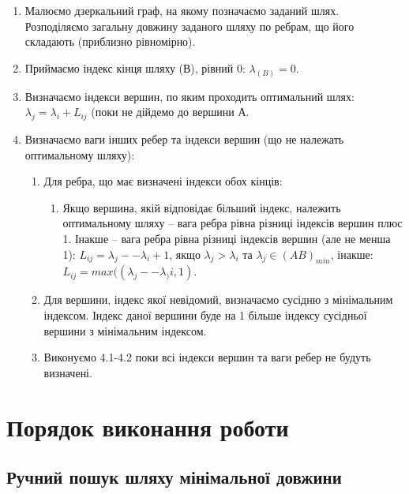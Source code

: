 \begin{enumerate}

\item Малюємо дзеркальний граф, на якому позначаємо заданий шлях.  Розподіляємо загальну довжину
  заданого шляху по ребрам, що його складають (приблизно рівномірно).

\item Приймаємо індекс кінця шляху ($В$), рівний 0: $\lambda_{(B)} = 0$.

\item Визначаємо індекси вершин, по яким проходить оптимальний шлях:
  $\lambda_{j} = \lambda_{i} + L_{ij}$ (поки не дійдемо до вершини $А$.

\item Визначаємо ваги інших ребер та індекси вершин (що не належать
  оптимальному шляху):

  \begin{enumerate}
  \item Для ребра, що має визначені індекси обох кінців:

    \begin{enumerate}
    \item Якщо вершина, якій відповідає більший індекс, належить оптимальному шляху -- вага ребра
      рівна різниці індексів вершин плюс 1.  Інакше -- вага ребра рівна різниці індексів вершин (але
      не менша 1): $L_{ij} = \lambda_{j} -- \lambda_{i}+1$, якщо $\lambda_{j} > \lambda_{i}$ та
      $\lambda_{j} \in (AB)_{min}$, інакше: $L_{ij} = max((\lambda_{j} -- \lambda_){i}, 1)$.

    \end{enumerate}
  \item Для вершини, індекс якої невідомий, визначаємо сусідню з мінімальним індексом. Індекс даної
    вершини буде на 1 більше індексу сусідньої вершини з мінімальним індексом.

  \item Виконуємо 4.1-4.2 поки всі індекси вершин та ваги ребер не будуть визначені.
  \end{enumerate}
\end{enumerate}

\section{Порядок виконання роботи}

\subsection{Ручний пошук шляху мінімальної довжини}

